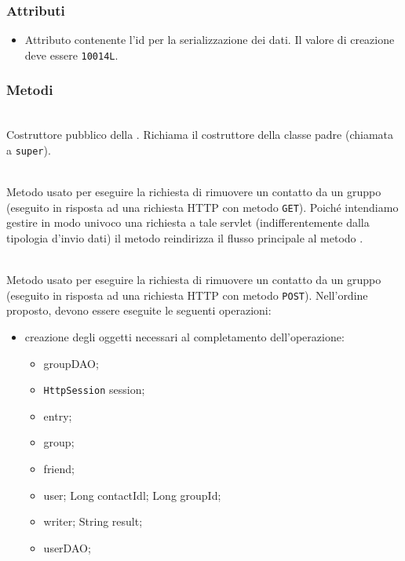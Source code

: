 \subsubsection*{Attributi}

\begin{itemize}
	\item{}
	Attributo contenente l'id per la serializzazione dei dati. Il valore di creazione deve essere \texttt{10014L}.
\end{itemize}

\subsubsection*{Metodi}

\begin{description}
	\item{}\\
	Costruttore pubblico della . Richiama il costruttore della classe padre (chiamata a \texttt{super}).
	
	\item{}\\
	Metodo usato per eseguire la richiesta di rimuovere un contatto da un gruppo (eseguito in risposta ad una richiesta HTTP con metodo \texttt{GET}). Poiché intendiamo gestire in modo univoco una richiesta a tale servlet (indifferentemente dalla tipologia d'invio dati) il metodo reindirizza il flusso principale al metodo .
	
	\item{}\\	
	Metodo usato per eseguire la richiesta di rimuovere un contatto da un gruppo (eseguito in risposta ad una richiesta HTTP con metodo \texttt{POST}). Nell'ordine proposto, devono essere eseguite le seguenti operazioni:
	\begin{itemize}
		\item creazione degli oggetti necessari al completamento dell'operazione:
		\begin{itemize}
			\item {} groupDAO;
			\item \texttt{HttpSession} session;
			\item {} entry;
			\item {} group;
			\item {} friend;
			\item {} user;
			Long contactIdl;
			Long groupId;
			\item {} writer;
			String result;
			\item {} userDAO;
		\end{itemize}
		

\end{itemize}
\end{description}

